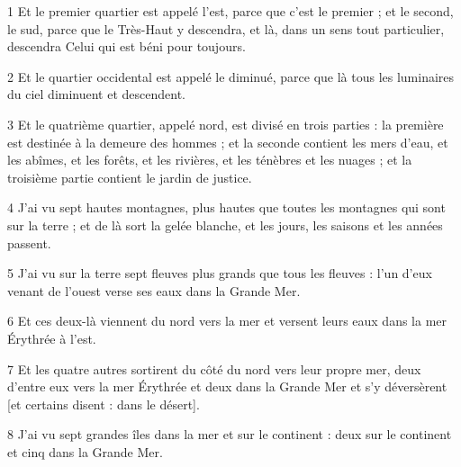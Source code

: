 
\par 1 Et le premier quartier est appelé l'est, parce que c'est le premier ; et le second, le sud, parce que le Très-Haut y descendra, et là, dans un sens tout particulier, descendra Celui qui est béni pour toujours.
\par 2 Et le quartier occidental est appelé le diminué, parce que là tous les luminaires du ciel diminuent et descendent.
\par 3 Et le quatrième quartier, appelé nord, est divisé en trois parties : la première est destinée à la demeure des hommes ; et la seconde contient les mers d'eau, et les abîmes, et les forêts, et les rivières, et les ténèbres et les nuages ​​; et la troisième partie contient le jardin de justice.
\par 4 J'ai vu sept hautes montagnes, plus hautes que toutes les montagnes qui sont sur la terre ; et de là sort la gelée blanche, et les jours, les saisons et les années passent.
\par 5 J'ai vu sur la terre sept fleuves plus grands que tous les fleuves : l'un d'eux venant de l'ouest verse ses eaux dans la Grande Mer.
\par 6 Et ces deux-là viennent du nord vers la mer et versent leurs eaux dans la mer Érythrée à l'est.
\par 7 Et les quatre autres sortirent du côté du nord vers leur propre mer, deux d'entre eux vers la mer Érythrée et deux dans la Grande Mer et s'y déversèrent [et certains disent : dans le désert].
\par 8 J'ai vu sept grandes îles dans la mer et sur le continent : deux sur le continent et cinq dans la Grande Mer.


